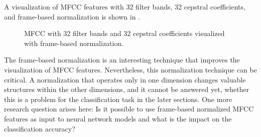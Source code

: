 A visualization of MFCC features with 32 filter bands, 32 cepstral coefficients, and frame-based normalization is shown in .
\begin{figure}[!ht]
  \centering
  \caption{MFCC with 32 filter bands and 32 cepstral coefficients visualized with frame-based normalization.}
  \label{fig:signal_mfcc_showcase_mfcc32}
\end{figure}
\FloatBarrier
\noindent
The frame-based normalization is an interesting technique that improves the visualization of MFCC features.
Nevertheless, this normalization technique can be critical. 
A normalization that operates only in one dimension changes valuable structures within the other dimensions, and it cannot be answered yet, whether this is a problem for the classification task in the later sections.
One more research question arises here: Is it possible to use frame-based normalized MFCC features as input to neural network models and what is the impact on the classification accuracy?


